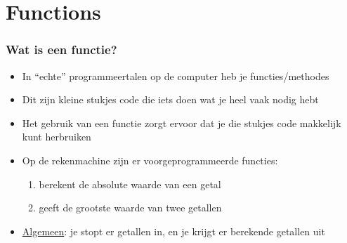 \section{Functions}

\begin{frame}
\frametitle{Wat is een functie?}

\begin{itemize}
  \item<1-> In ``echte'' programmeertalen op de computer heb je functies/methodes
  \item<2-> Dit zijn kleine stukjes code die iets doen wat je heel vaak nodig hebt
  \item<3-> Het gebruik van een functie zorgt ervoor dat je die stukjes code makkelijk kunt herbruiken
  \item<4-> Op de rekenmachine zijn er voorgeprogrammeerde functies:
  \begin{enumerate}
    \item<5->  berekent de absolute waarde van een getal
    \item<6->  geeft de grootste waarde van twee getallen
  \end{enumerate}
  \item<7-> \underline{Algemeen}: je stopt er getallen in, en je krijgt er berekende getallen uit
\end{itemize}

\vspace{2cm}


\end{frame}
